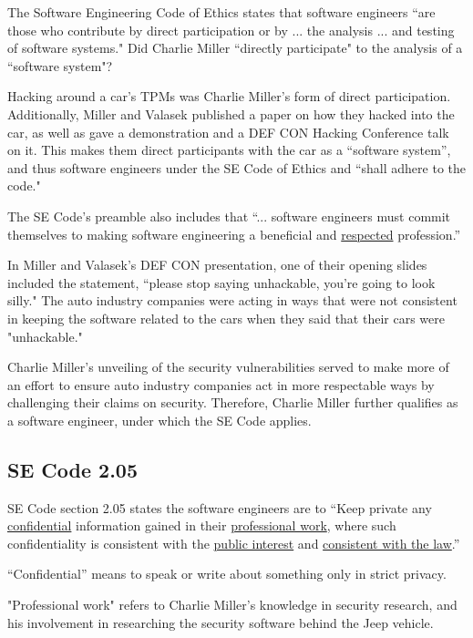 \documentclass[12pt]{article}
\begin{document}
\begin{multicols}{2}
The Software Engineering Code of Ethics states that software engineers ``are those who contribute by direct participation or by ... the analysis ... and testing of software systems."\cite{seCode} Did Charlie Miller ``directly participate" to the analysis of a ``software system"?

Hacking around a car's TPMs was Charlie Miller's form of direct participation. Additionally,  Miller and Valasek published a paper on how they hacked into the car\cite{officialPaper}, as well as gave a demonstration\cite{wired} and a DEF CON Hacking Conference talk on it\cite{youtube}. This makes them direct participants with the car as a ``software system'', and thus software engineers under the SE Code of Ethics and ``shall adhere to the code."\cite{seCode}

The SE Code's preamble also includes that ``... software engineers must commit themselves to making software engineering a beneficial and \underline{respected} profession.''

In Miller and Valasek's DEF CON presentation, one of their opening slides included the statement, ``please stop saying unhackable, you're going to look silly." The auto industry companies were acting in ways that were not consistent in keeping the software related to the cars when they said that their cars were "unhackable."

Charlie Miller's unveiling of the security vulnerabilities served to make more of an effort to ensure auto industry companies act in more respectable ways by challenging their claims on security. Therefore, Charlie Miller further qualifies as a software engineer, under which the SE Code applies.

\subsection{SE Code 2.05}

SE Code section 2.05 states the software engineers are to ``Keep private any \underline{confidential} information gained in their \underline{professional work}, where such confidentiality is consistent with the \underline{public interest} and \underline{consistent with the law}.''

``Confidential'' means to speak or write about something only in strict privacy.\cite{dictionary}

"Professional work" refers to Charlie Miller's knowledge in security research, and his involvement in researching the security software behind the Jeep vehicle. 


\end{multicols}
\end{document}
